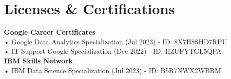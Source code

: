 \section{Licenses \& Certifications}
    \begin{itemize}[leftmargin=0.15in, label={}]
    \small{\item{
        \textbf{Google Career Certificates}\\
        • Google Data Analytics Specialization (Jul 2023) - ID: 8X7H8SHD7RPU\\
        • IT Support Google Specialization (Dec 2022) - ID: HZUFYTGL5QPA\\
        \textbf{IBM Skills Network}\\
        • IBM Data Science Specialization (Jul 2023) - ID: B5R7NWX2WBRM
    }}
    \end{itemize}